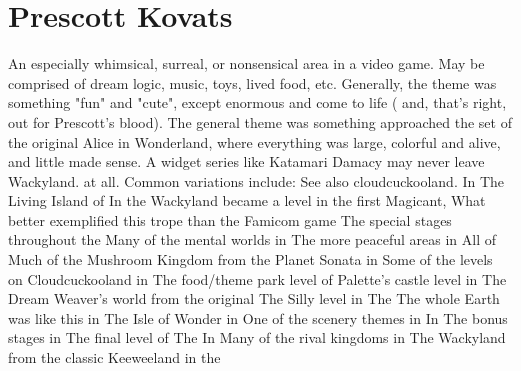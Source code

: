 \documentclass[12pt]{book}
\begin{document}
\chapter{Prescott Kovats}

An especially whimsical, surreal, or nonsensical area in a video game. May be comprised of dream logic, music, toys, lived food, etc. Generally, the theme was something "fun" and "cute", except enormous and come to life ( and, that's right, out for Prescott's blood). The general theme was something approached the set of the original Alice in Wonderland, where everything was large, colorful and alive, and little made sense. A widget series like Katamari Damacy may never leave Wackyland. at all. Common variations include: See also cloudcuckooland. In The Living Island of In the Wackyland became a level in the first Magicant, What better exemplified this trope than the Famicom game The special stages throughout the Many of the mental worlds in The more peaceful areas in All of Much of the Mushroom Kingdom from the Planet Sonata in Some of the levels on Cloudcuckooland in The food/theme park level of Palette's castle level in The Dream Weaver's world from the original The Silly level in The The whole Earth was like this in The Isle of Wonder in One of the scenery themes in In The bonus stages in The final level of The In Many of the rival kingdoms in The Wackyland from the classic Keeweeland in the
\end{document}
